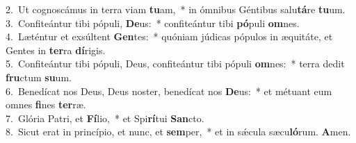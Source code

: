 {2.~}Ut cognoscámus in terra viam \textbf{tu}am,~* in ómnibus Géntibus salu\textbf{tá}re \textbf{tu}um.\\
{3.~}Confiteántur tibi pópuli, \textbf{De}us:~* confiteántur tibi \textbf{pó}puli \textbf{om}nes.\\
{4.~}Læténtur et exsúltent \textbf{Gen}tes:~* quóniam júdicas pópulos in æquitáte, et Gentes in \textbf{ter}ra \textbf{dí}rigis.\\
{5.~}Confiteántur tibi pópuli, Deus, confiteántur tibi pópuli \textbf{om}nes:~* terra dedit \textbf{fru}ctum \textbf{su}um.\\
{6.~}Benedícat nos Deus, Deus noster, benedícat nos \textbf{De}us:~* et métuant eum omnes \textbf{fi}nes \textbf{ter}ræ.\\
{7.~}Glória Patri, et \textbf{Fí}lio,~* et Spi\textbf{rí}tui \textbf{San}cto.\\
{8.~}Sicut erat in princípio, et nunc, et \textbf{sem}per,~* et in sǽcula sæcu\textbf{ló}rum. \textbf{A}men.\\

